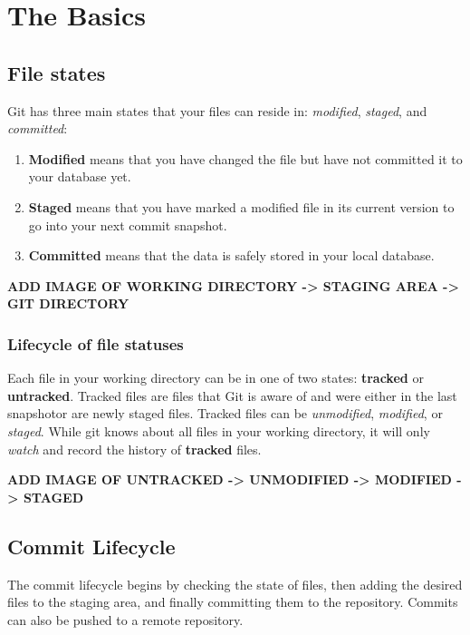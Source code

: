 \chapter{The Basics}

\section{File states}
Git has three main states that your files can reside in: \textit{modified}, \textit{staged}, and \textit{committed}:
\begin{enumerate}
    \item \textbf{Modified} means that you have changed the file but have not committed it to your database yet.
    \item \textbf{Staged} means that you have marked a modified file in its current version to go into your next commit snapshot.
    \item \textbf{Committed} means that the data is safely stored in your local database.
\end{enumerate}

    \textbf{ADD IMAGE OF WORKING DIRECTORY -> STAGING AREA -> GIT DIRECTORY }\newline
    
\subsection{Lifecycle of file statuses}
Each file in your working directory can be in one of two states: \textbf{tracked} or \textbf{untracked}. Tracked files are files that Git is aware of and were either in the last snapshot\footnotemark or are newly staged files.
Tracked files can be \textit{unmodified}, \textit{modified}, or \textit{staged}. \newline
While git knows about all files in your working directory, it will only \textit{watch} and record the history of \textbf{tracked} files.

    \textbf{ADD IMAGE OF UNTRACKED -> UNMODIFIED -> MODIFIED -> STAGED}\newline

\section{Commit Lifecycle}
The commit lifecycle begins by checking the state of files, then adding the desired files to the staging area, and finally committing them to the repository. Commits can also be pushed to a remote repository.


